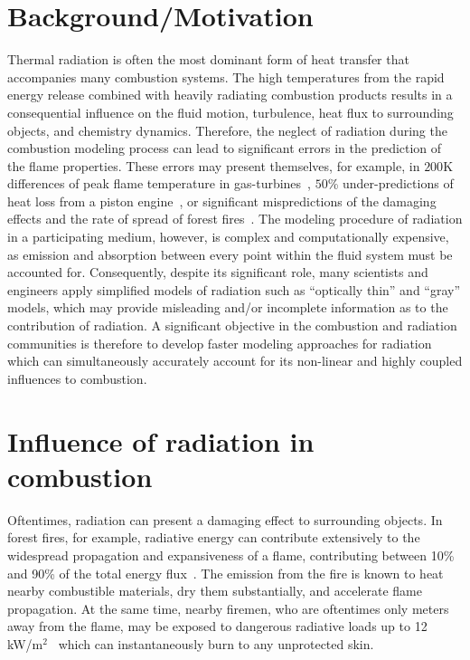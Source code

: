 \section{Background/Motivation}
Thermal radiation is often the most dominant form of heat transfer that accompanies many combustion systems. The high temperatures from the rapid energy release combined with heavily radiating combustion products results in a consequential influence on the fluid motion, turbulence, heat flux to surrounding objects, and chemistry dynamics. Therefore, the neglect of radiation during the combustion modeling process can lead to significant errors in the prediction of the flame properties. These errors may present themselves, for example, in $200$K differences of peak flame temperature in gas-turbines~\cite{Gamil2020AssessmentChamber}, $50$\% under-predictions of heat loss from a piston engine~\cite{Modest2016RadiativeSystems}, or significant mispredictions of the damaging effects and the rate of spread of forest fires~\cite{Valendik2008EffectEnvironment}. The modeling procedure of radiation in a participating medium, however, is complex and computationally expensive, as emission and absorption between every point within the fluid system must be accounted for. Consequently, despite its significant role, many scientists and engineers apply simplified models of radiation such as “optically thin” and “gray” models, which may provide misleading and/or incomplete information as to the contribution of radiation. 
A significant objective in the combustion and radiation communities is therefore to develop faster modeling approaches for radiation which can simultaneously accurately account for its non-linear and highly coupled influences to combustion.

\section{Influence of radiation in combustion}

Oftentimes, radiation can present a damaging effect to surrounding objects.
In forest fires, for example, radiative energy can contribute extensively to the widespread propagation and expansiveness of a flame, contributing between 10\% and 90\% of the total energy flux~\cite{Valendik2008EffectEnvironment}. 
The emission from the fire is known to heat nearby combustible materials, dry them substantially, and accelerate flame propagation. At the same time, nearby firemen, who are oftentimes only meters away from the flame, may be exposed to dangerous radiative loads up to 12 kW/m$^2$~\cite{Valendik2008EffectEnvironment} which can instantaneously burn to any unprotected skin.


